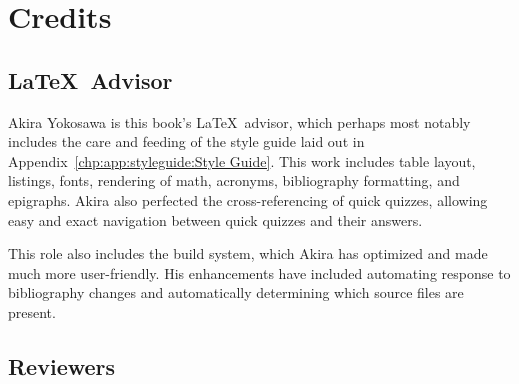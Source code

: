 
\chapter{Credits}
\label{bck:ack:Credits}
%



\section{\LaTeX\ Advisor}

Akira Yokosawa is this book's \LaTeX\ advisor, which perhaps most
notably includes the care and feeding of the style guide laid out
in Appendix~\ref{chp:app:styleguide:Style Guide}.
This work includes table layout, listings, fonts, rendering of math,
acronyms, bibliography formatting, and epigraphs.
Akira also perfected the cross-referencing of quick quizzes, allowing
easy and exact navigation between quick quizzes and their answers.

This role also includes the build system, which Akira has optimized and
made much more user-friendly.
His enhancements have included automating response to bibliography
changes and automatically determining which source files are present.

\section{Reviewers}


